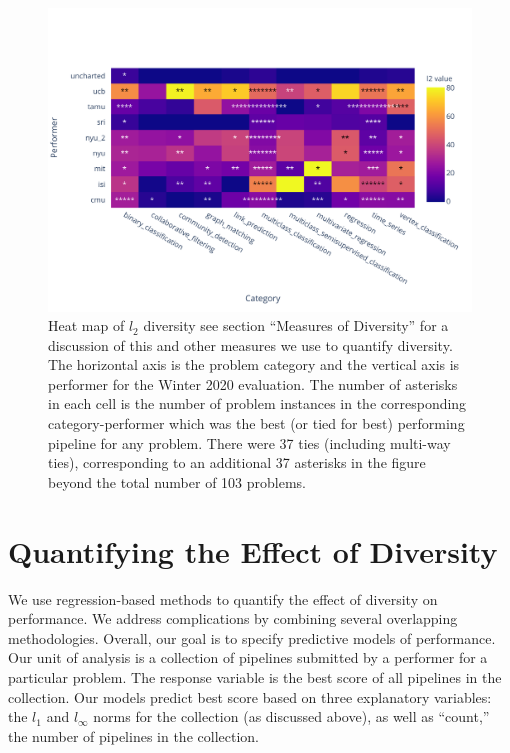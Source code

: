 \documentclass{article}
\begin{document}
\begin{figure}
\centering
\includegraphics[scale=1.3]{heatmap.pdf}
\caption{Heat map of $l_2$ diversity see section ``Measures of
  Diversity'' for a discussion of this and other measures we use to
  quantify diversity.  The horizontal axis is the problem category and
  the vertical axis is performer for the Winter 2020 evaluation.  The
  number of asterisks in each cell is the number of problem instances
  in the corresponding category-performer which was the best (or tied
  for best) performing pipeline for any problem.  There were 37 ties
  (including multi-way ties), corresponding to an additional 37
  asterisks in the figure beyond the total number of 103 problems.}
\label{fig:heatmap}
\end{figure}

\section{Quantifying the Effect of Diversity}
\label{sec:quantifying}
We use regression-based methods to quantify the effect of diversity on
performance.  We address complications by combining several
overlapping methodologies.  Overall, our goal is to specify predictive
models of performance.  Our unit of analysis is a collection of
pipelines submitted by a performer for a particular problem.  The
response variable is the best score of all pipelines in the
collection.  Our models predict best score based on three explanatory
variables: the $l_1$ and $l_\infty$ norms for the collection (as
discussed above), as well as ``count,'' the number of pipelines in the
collection.
\end{document}
